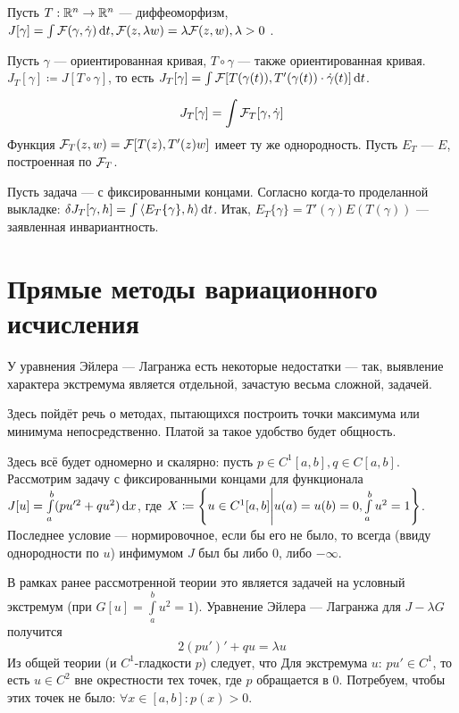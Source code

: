 \documentclass[a4paper]{article}
\begin{document}
    Пусть $T: \mathbb{R}^n \rightarrow \mathbb{R}^n$ --- диффеоморфизм, $J[\gamma] = \int\mathcal{F}(\gamma, \dot{\gamma})\operatorname{d}\! t, \mathcal{F}(z, \lambda w) = \lambda\mathcal{F}(z, w), \lambda > 0$ .

    Пусть $\gamma$ --- ориентированная кривая, $T \circ \gamma$ --- также ориентированная кривая.
    $J_T[\gamma] \coloneqq J[T \circ \gamma]$, то есть $J_T[\gamma] = \int \mathcal{F}[T(\gamma(t)), T'(\gamma(t)) \cdot \dot{\gamma}(t)]\operatorname{d}\! t$.

    \[J_T[\gamma] = \int\mathcal{F}_T[\gamma, \dot{\gamma}]\]
    Функция $\mathcal{F}_T(z, w) = \mathcal{F}[T(z), T'(z)w]$ имеет ту же однородность.
    Пусть $E_T$ --- $E$, построенная по $\mathcal{F}_T$.

    Пусть задача --- с фиксированными концами.
    Согласно когда-то проделанной выкладке: $\delta J_T[\gamma, h] = \int\left\langle E_T\{\gamma\}, h\right\rangle\operatorname{d}\! t$.
    Итак, $E_T\{\gamma\} = T'(\gamma) E(T(\gamma))$ --- заявленная инвариантность.
    \section{Прямые методы вариационного исчисления}
    У уравнения Эйлера --- Лагранжа есть некоторые недостатки --- так, выявление характера экстремума является отдельной, зачастую весьма сложной, задачей.

    Здесь пойдёт речь о методах, пытающихся построить точки максимума или минимума непосредственно.
    Платой за такое удобство будет общность.

    Здесь всё будет одномерно и скалярно: пусть $p \in C^1[a, b],  q\in C[a, b]$.
    Рассмотрим задачу с фиксированными концами для функционала $J[u] = \int\limits_{a}^{b}(p u'^2 + qu^2)\operatorname{d}\! x$, где $X \coloneqq \left\{u \in C^1[a, b]\middle|u(a) = u(b) = 0, \int\limits_{a}^{b}u^2 = 1\right\}$.
    Последнее условие --- нормировочное, если бы его не было, то всегда (ввиду однородности по $u$) инфимумом $J$ был бы либо $0$, либо $-\infty$.

    В рамках ранее рассмотренной теории это является задачей на условный экстремум (при $G[u] = \int\limits_{a}^{b}u^2 = 1$).
    Уравнение Эйлера --- Лагранжа для $J - \lambda G$ получится
    \[2 (p u')' + qu = \lambda u\tag{$*$}\label{sturm}\]
    Из общей теории (и $C^1$-гладкости $p$) следует, что Для экстремума $u$: $p u' \in C^1$, то есть $u \in C^2$ вне окрестности тех точек, где $p$ обращается в $0$.
    Потребуем, чтобы этих точек не было: $\forall x \in [a, b]: p(x) > 0$.
\end{document}
